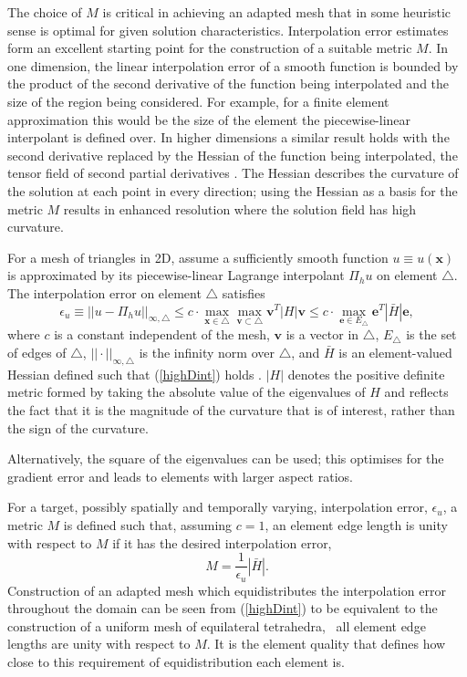 The choice of $M$ is critical in achieving an adapted mesh that in
some heuristic sense is optimal for given solution characteristics.
Interpolation error estimates form an excellent starting point for the
construction of a suitable metric $M$.  In one dimension, the linear
interpolation error of a smooth function is bounded by the product of
the second derivative of the function being interpolated and the size
of the region being considered. For example, for a finite element
approximation this would be the size of the element the
piecewise-linear interpolant is defined over.  In higher dimensions a
similar result holds with the second derivative replaced by the
Hessian of the function being interpolated, the tensor field of second
partial derivatives \citep{dazevedo1991,george1998,frey2005}. The
Hessian describes the curvature of the solution at each point in every
direction; using the Hessian as a basis for the metric $M$ results in
enhanced resolution where the solution field has high curvature.

For a mesh of triangles in 2D, assume a sufficiently smooth function
$u\equiv u(\pmb{x})$ is approximated by its piecewise-linear Lagrange
interpolant $\Pi_h u$ on element $\triangle$. The interpolation error
on element $\triangle$ satisfies
\begin{equation}
\epsilon_u\equiv ||{u} - \Pi_h{u}||_{\infty,\triangle}
\le c\cdot
\max_{\pmb{x}\in \triangle}\max_{\pmb{v}\subset \triangle} \pmb{v}^T |H| \pmb{v}
\le c \cdot\max_{\pmb{e}\in E_{\triangle}}\pmb{e}^T |\bar{H}| \pmb{e},
\label{highDint}
\end{equation}
where $c$ is a constant independent of the mesh, $\pmb{v}$ is a vector
in $\triangle$, $E_{\triangle}$ is the set of edges of $\triangle$,
$||\cdot||_{\infty,\triangle}$ is the infinity norm over $\triangle$,
and $\bar{H}$ is an element-valued Hessian defined such that
(\ref{highDint}) holds \citep{frey2005}. $|H|$ denotes the positive
definite metric formed by taking the absolute value of the eigenvalues
of ${H}$ and reflects the fact that it is the magnitude of the
curvature that is of interest, rather than the sign of the curvature.

Alternatively, the square of the eigenvalues can be used; this
optimises for the gradient error \citep{dazevedo1991, shewchuk2002}
and leads to elements with larger aspect ratios.

For a target, possibly spatially and temporally varying, interpolation
error, $\epsilon_u$, a metric $M$ is defined such that, assuming
$c=1$, an element edge length is unity with respect to $M$ if it has
the desired interpolation error, \ie\
\begin{equation}
  M = \frac{1}{\epsilon_u} {|\bar{H}|}.
  \label{eqn:ME}
\end{equation}
Construction of an adapted mesh which equidistributes the
interpolation error throughout the domain can be seen from
(\ref{highDint}) to be equivalent to the construction of a uniform
mesh of equilateral tetrahedra, \ie\ all element edge lengths are
unity with respect to $M$. It is the element quality that defines how
close to this requirement of equidistribution each element is.

